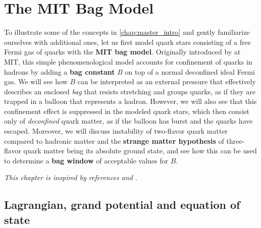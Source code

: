 \chapter{The MIT Bag Model}
\label{chap:mit}

To illustrate some of the concepts in \cref{chap:master_intro} and gently familiarize ourselves with additional ones,
let us first model quark stars consisting of a free Fermi gas of quarks with the \textbf{MIT bag model}.
Originally introduced by \cite{ref:mit_bag_model_original} at MIT,
this simple phenomenological model accounts for confinement of quarks in hadrons by adding a \textbf{bag constant} $B$ on top of a normal deconfined ideal Fermi gas.
We will see how $B$ can be interpreted as an external pressure that effectively describes an enclosed \emph{bag}
that resists stretching and groups quarks,
as if they are trapped in a balloon that represents a hadron.
However, we will also see that this confinement effect is suppressed in the modeled quark stars,
which then consist only of \emph{deconfined} quark matter,
as if the balloon has burst and the quarks have escaped.
Moreover, we will discuss instability of two-flavor quark matter compared to hadronic matter 
and the \textbf{strange matter hypothesis} of three-flavor quark matter being its absolute ground state,
and see how this can be used to determine a \textbf{bag window} of acceptable values for $B$.

\textit{This chapter is inspired by references \cite{ref:glendenning} and \cite{ref:quark_bag_model}.}

\section{Lagrangian, grand potential and equation of state}
\label{sec:mit:eos}

